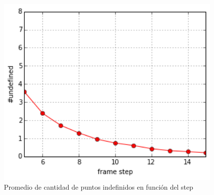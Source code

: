 \begin{figure}
\centering
\includegraphics[width=12.5cm]{images/window_selection.png}
\caption{Promedio de cantidad de puntos indefinidos en función del step}
\label{fig:window_selection_average}
\end{figure}


